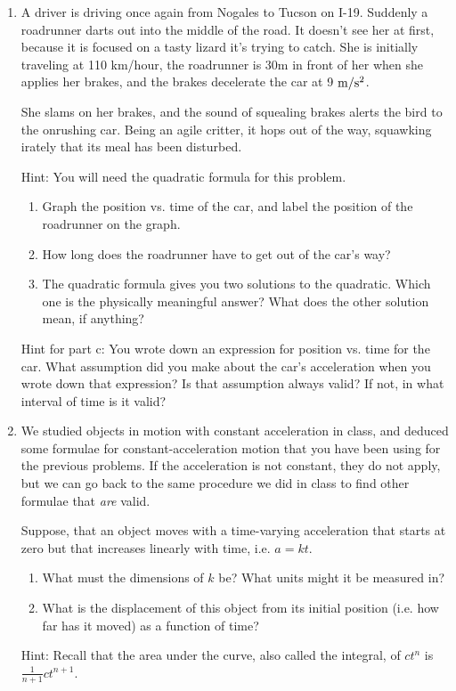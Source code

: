 \documentclass[12pt]{article}
\begin{document}
\begin{enumerate}
\bigskip
\bigskip

\item A driver is driving once again from Nogales to Tucson on I-19. Suddenly a roadrunner darts out into the middle of the road. It doesn't see her at first, because it is focused on a tasty lizard it's trying to catch. She is initially traveling at 110 km/hour, the roadrunner is 30m in front of her when she applies her brakes, and the brakes decelerate the car at 9 $\rm m/\rm s^2$.

She slams on her brakes, and the sound of squealing brakes alerts the bird to the onrushing car. Being an agile critter, it hops out of the way, squawking irately that its meal has been disturbed.

    Hint: You will need the quadratic formula for this problem.
\begin{enumerate}
\item    Graph the position vs. time of the car, and label the position of the roadrunner on the graph.
\item    How long does the roadrunner have to get out of the car's way?
\item    The quadratic formula gives you two solutions to the quadratic. Which one is the physically meaningful answer? What does the other solution mean, if anything?
\end{enumerate}

Hint for part c: You wrote down an expression for position vs. time for the car. What assumption did you make
about the car's acceleration when you wrote down that expression? Is that assumption always valid? If not,
in what interval of time is it valid?

\bigskip
\bigskip

\item We studied objects in motion with constant acceleration in class, and deduced some formulae for 
constant-acceleration motion that you have been using for the previous problems. If the acceleration is not
constant, they do not apply, but we can go back to the same procedure we did in class to find other formulae that
{\it are} valid.

 Suppose, that an object moves with a time-varying acceleration that starts at zero but that increases linearly with time, i.e. $a = kt$. 

\begin{enumerate}
\item What must the dimensions of $k$ be? What units might it be measured in?
\item What is the displacement of this object from its initial position (i.e. how far has it moved) as a function of time?
\end{enumerate}

Hint: Recall that the area under the curve, also called the integral, of $ct^n$ is $\frac{1}{n+1}ct^{n+1}$.

\end{enumerate}
\end{document}
